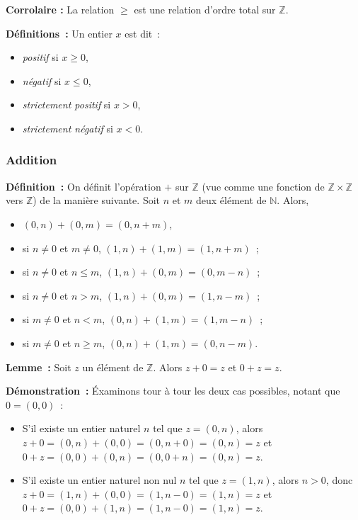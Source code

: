    \done 

\medskip

\noindent\textbf{Corrolaire :} La relation $\geq$ est une relation d'ordre total sur $\mathbb{Z}$.

\medskip

\noindent\textbf{Définitions :} Un entier $x$ est dit : 
\begin{itemize}[nosep]
    \item \textit{positif} si $x \geq 0$,
    \item \textit{négatif} si $x \leq 0$,
    \item \textit{strictement positif} si $x > 0$,
    \item \textit{strictement négatif} si $x < 0$.
\end{itemize}

\subsubsection{Addition}

\noindent\textbf{Définition :} 
    On définit l'opération $+$ sur $\mathbb{Z}$ (vue comme une fonction de $\mathbb{Z} \times \mathbb{Z}$ vers $\mathbb{Z}$) de la manière suivante.
    Soit $n$ et $m$ deux élément de $\mathbb{N}$.
    Alors, 
    \begin{itemize}[nosep]
        \item $(0,n) + (0,m) = (0, n+m)$,
        \item si $n \neq 0$ et $m \neq 0$, $(1,n) + (1,m) = (1, n+m)$ ;
        \item si $n \neq 0$ et $n \leq m$, $(1,n) + (0,m) = (0, m-n)$ ;
        \item si $n \neq 0$ et $n > m$, $(1,n) + (0,m) = (1, n-m)$ ;
        \item si $m \neq 0$ et $n < m$, $(0,n) + (1,m) = (1, m-n)$ ;
        \item si $m \neq 0$ et $n \geq m$, $(0,n) + (1,m) = (0, n-m)$.
    \end{itemize}

\medskip

\noindent\textbf{Lemme :} Soit $z$ un élément de $\mathbb{Z}$. 
    Alors $z + 0 = z$ et $0 + z = z$.

\medskip

\noindent\textbf{Démonstration :} Éxaminons tour à tour les deux cas possibles, notant que $0 = (0,0)$ : 
    \begin{itemize}[nosep]
        \item S'il existe un entier naturel $n$ tel que $z = (0,n)$, alors $z + 0 = (0,n) + (0,0) = (0,n+0) = (0,n) = z$ et $0 + z = (0,0) + (0,n) = (0,0+n) = (0,n) = z$.
        \item S'il existe un entier naturel non nul $n$ tel que $z = (1,n)$, alors $n > 0$, donc $z + 0 = (1,n) + (0,0) = (1,n-0) = (1,n) = z$ et $0 + z = (0,0) + (1,n) = (1,n-0) = (1,n) = z$.
    \end{itemize}
    
